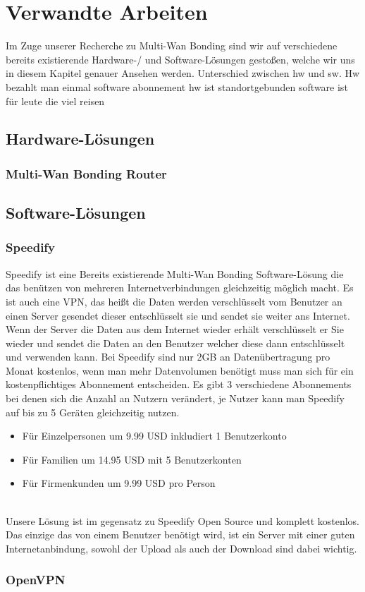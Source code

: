 \chapter{Verwandte Arbeiten}
\label{chap:VerwandteArbeiten}
Im Zuge unserer Recherche zu Multi-Wan Bonding sind wir auf verschiedene bereits existierende Hardware-/ und Software-Lösungen gestoßen, welche wir uns in diesem Kapitel genauer Ansehen werden.
Unterschied zwischen hw und sw. Hw bezahlt man einmal software abonnement hw ist standortgebunden software ist für leute die viel reisen
\section{Hardware-Lösungen}
\subsection{Multi-Wan Bonding Router}
\section{Software-Lösungen}
\subsection{Speedify}
Speedify ist eine Bereits existierende Multi-Wan Bonding Software-Lösung die das benützen von mehreren Internetverbindungen gleichzeitig möglich macht. Es ist auch eine VPN, das heißt die Daten werden verschlüsselt vom Benutzer an einen Server gesendet dieser entschlüsselt sie und sendet sie weiter ans Internet. Wenn der Server die Daten aus dem Internet wieder erhält verschlüsselt er Sie wieder und sendet die Daten an den Benutzer welcher diese dann entschlüsselt und verwenden kann.
Bei Speedify sind nur 2GB an Datenübertragung pro Monat kostenlos, wenn man mehr Datenvolumen benötigt muss man sich für ein kostenpflichtiges Abonnement entscheiden. Es gibt 3 verschiedene Abonnements bei denen sich die Anzahl an Nutzern verändert, je Nutzer kann man Speedify auf bis zu 5 Geräten gleichzeitig nutzen.
\begin{itemize}
    \item Für Einzelpersonen um 9.99 USD inkludiert 1 Benutzerkonto
    \item Für Familien um 14.95 USD mit 5 Benutzerkonten
    \item Für Firmenkunden um 9.99 USD pro Person
\end{itemize}
\  \\
Unsere Lösung ist im gegensatz zu Speedify Open Source und komplett kostenlos. Das einzige das von einem Benutzer benötigt wird, ist ein Server mit einer guten Internetanbindung, sowohl der Upload als auch der Download sind dabei wichtig.
\subsection{OpenVPN}